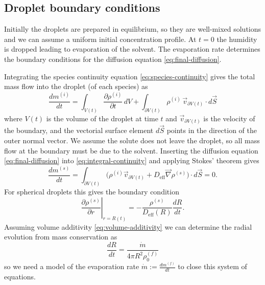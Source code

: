 \documentclass[11pt,twoside]{report}
\begin{document}
\subsection{Droplet boundary conditions}

Initially the droplets are prepared in equilibrium, so they are well-mixed solutions and we can assume a uniform initial concentration profile.
At $t=0$ the humidity is dropped leading to evaporation of the solvent.
The evaporation rate determines the boundary conditions for the diffusion equation \eqref{eq:final-diffusion}.

Integrating the species continuity equation \eqref{eq:species-continuity} gives the total mass flow into the droplet (of each species) as
\begin{equation}\label{eq:integral-continuity}
  \frac{d m^{(i)}}{dt} =
  \int_{V(t)} \frac{\partial \rho^{(i)}}{\partial t} \, d V +
  \int_{\partial V(t)} \rho^{(i)} \, \vec{v}_{\partial V(t)} \cdot d\vec{S}
\end{equation}
where $V(t)$ is the volume of the droplet at time $t$ and $\vec{v}_{\partial V(t)}$ is the velocity of the boundary, and the vectorial surface element $d\vec{S}$ points in the direction of the outer normal vector.
We assume the solute does not leave the droplet, so all mass flow at the boundary must be due to the solvent.
Inserting the diffusion equation \eqref{eq:final-diffusion} into \eqref{eq:integral-continuity} and applying Stokes' theorem gives
\begin{equation}
  \frac{d m^{(s)}}{dt}
  =
  \int_{\partial V(t)}
  \Big(
  \rho^{(i)} \vec{v}_{\partial V(t)} +
  D_\mathrm{eff} \vec{\nabla} \rho^{(s)}
  \Big)
  \cdot d\vec{S}
  = 0.
\end{equation}
For spherical droplets this gives the boundary condition
\begin{equation}
  \left. \frac{\partial \rho^{(s)}}{\partial r} \right|_{r=R(t)}
  =
  -
  \frac{\rho^{(s)}}{D_\mathrm{eff}(R)}
  \frac{dR}{dt}.
\end{equation}
Assuming volume additivity \eqref{eq:volume-additivity} we can determine the radial evolution from mass conservation as
\begin{equation}\label{eq:radial-evolution}
  \frac{dR}{dt}
  =
  \frac{\dot{m}}{4\pi R^2 \rho^{(f)}_0}
\end{equation}
so we need a model of the evaporation rate $\dot{m} := \tfrac{dm^{(f)}}{dt}$ to close this system of equations.
\end{document}
